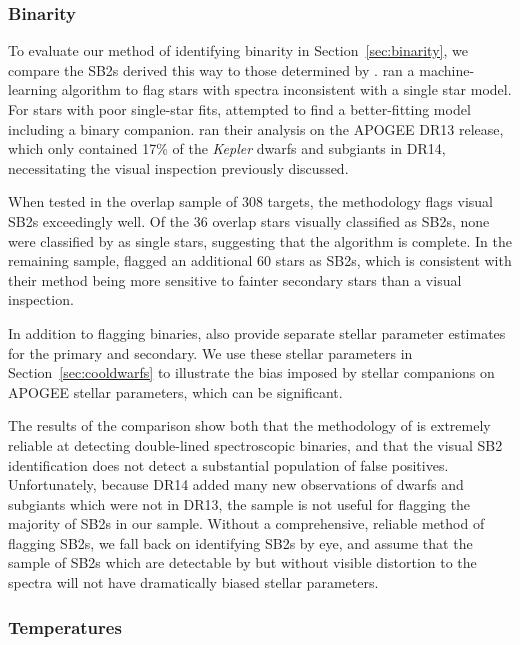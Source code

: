 \documentclass[preprint2]{aastex62}
\newcommand{\Kepler}{\mbox{\textit{Kepler}}}
\begin{document}
\subsubsection{Binarity}

To evaluate our method of identifying binarity in Section~\ref{sec:binarity}, 
we compare the SB2s derived this way to those determined by \citet{ElBadry18b}. 
\citet{ElBadry18b} ran a machine-learning algorithm to flag
stars with spectra inconsistent with a
single star model.  For stars with poor single-star fits, \citet{ElBadry18b} 
attempted to find a better-fitting model including a binary companion. 
\citet{ElBadry18b} ran their analysis on the APOGEE DR13 release, which 
only contained 17\% of the \Kepler{} dwarfs and subgiants in DR14,
necessitating the visual inspection previously discussed. 

When tested in the overlap sample of 308 targets, the \citet{ElBadry18b} 
methodology flags visual SB2s exceedingly well.
Of the 36 overlap stars visually classified as SB2s, none were classified by 
\citet{ElBadry18b} as single stars, suggesting that the \citet{ElBadry18b}
algorithm is complete. In the remaining sample, \citet{ElBadry18b}
flagged an additional 60 stars as SB2s, which is consistent with their method 
being more sensitive to fainter secondary stars than a visual inspection. 

In addition to flagging binaries, \citet{ElBadry18b} also provide separate 
stellar parameter estimates for the primary and secondary. We use these stellar 
parameters in Section~\ref{sec:cooldwarfs} to illustrate the bias imposed by 
stellar companions on APOGEE stellar parameters, which can be significant.

The results of the comparison show both that the methodology of \citet{ElBadry18b} is extremely reliable at detecting double-lined spectroscopic binaries, and that the visual SB2 identification does not detect a substantial population of false positives. Unfortunately, because DR14 added many new observations of dwarfs and subgiants which were not in DR13,  the \citet{ElBadry18b} sample is not useful for flagging the majority of SB2s in our sample. Without a comprehensive, reliable method of flagging SB2s, we fall back on identifying SB2s by eye, and assume that the sample of SB2s which are detectable by \citet{ElBadry18b} but without visible distortion to the spectra will not have dramatically biased stellar parameters.

\subsubsection{Temperatures}
\end{document}
